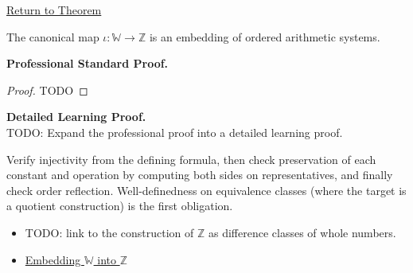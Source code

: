 \newpage
{}
\label{prf:w-embeds-in-z}

\begin{remark*}[Return]
\hyperref[thm:w-embeds-in-z]{Return to Theorem}
\end{remark*}

\begin{theorem*}
The canonical map $\iota:\mathbb{W}\to \mathbb{Z}$ is an embedding of ordered arithmetic systems.
\end{theorem*}

\textbf{Professional Standard Proof.}~\\
\begin{proof}
TODO
\end{proof}

\textbf{Detailed Learning Proof.}~\\
TODO: Expand the professional proof into a detailed learning proof.

\begin{remark*}
Verify injectivity from the defining formula, then check preservation of each constant and operation by computing both sides on representatives, and finally check order reflection. Well-definedness on equivalence classes (where the target is a quotient construction) is the first obligation.
\end{remark*}

\begin{dependencies}
\begin{itemize}
  \item TODO: link to the construction of $\mathbb{Z}$ as difference classes of whole numbers.
  \item \hyperref[def:embedding-w-into-z]{Embedding $\mathbb{W}$ into $\mathbb{Z}$}
\end{itemize}
\end{dependencies}
